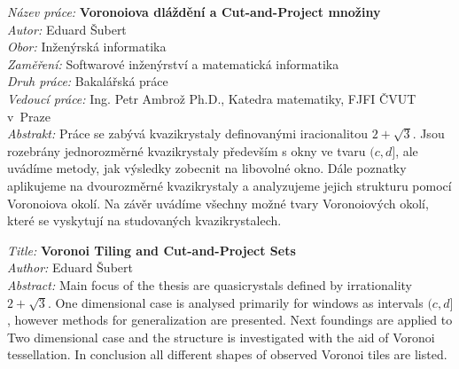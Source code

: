 \documentclass[a4paper,11pt,twoside]{article}
\theoremstyle{definition}
\theoremstyle{remark}
\begin{document}
\vspace*{2cm}


\clearpage
\thispagestyle{empty}
\cleardoublepage

\thispagestyle{empty}

{
\setlength{\parindent}{0pt}

\textit{Název práce:}
\textbf{Voronoiova dláždění a Cut-and-Project množiny} \\

\textit{Autor:} Eduard Šubert \\

\textit{Obor:} Inženýrská informatika \\

\textit{Zaměření:} Softwarové inženýrství a matematická informatika \\

\textit{Druh práce:} Bakalářská práce \\

\textit{Vedoucí práce:}  Ing. Petr Ambrož Ph.D., Katedra matematiky, FJFI ČVUT v~Praze \\

\textit{Abstrakt:} 
Práce se zabývá kvazikrystaly definovanými iracionalitou $2+\sqrt{3}$. Jsou rozebrány jednorozměrné kvazikrystaly především s okny ve tvaru $(c,d]$, ale uvádíme metody, jak výsledky zobecnit na libovolné okno. Dále poznatky aplikujeme na dvourozměrné kvazikrystaly a analyzujeme jejich strukturu pomocí Voronoiova okolí. Na závěr uvádíme všechny možné tvary Voronoiových okolí, které se vyskytují na studovaných kvazikrystalech. \\

\vspace{1.5cm}

\textit{Title:}
\textbf{Voronoi Tiling and Cut-and-Project Sets} \\

\textit{Author:} Eduard Šubert\\

\textit{Abstract:} 
Main focus of the thesis are quasicrystals defined by irrationality $2+\sqrt{3}$. One dimensional case is analysed primarily for windows as intervals $(c,d]$, however methods for generalization are presented. Next foundings are applied to Two dimensional case and the structure is investigated with the aid of Voronoi  tessellation. In conclusion all different shapes of observed Voronoi tiles are listed.\\

}
\end{document}
